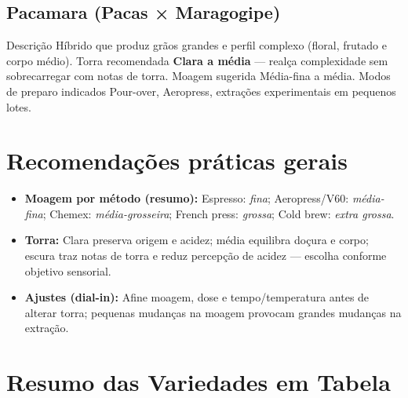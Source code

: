 \documentclass[a4paper,12pt]{article}
\begin{document}
\subsection{Pacamara (Pacas × Maragogipe)}
{Descrição} Híbrido que produz grãos grandes e perfil complexo (floral, frutado e corpo médio).  
{Torra recomendada} \textbf{Clara a média} — realça complexidade sem sobrecarregar com notas de torra.  
{Moagem sugerida} Média-fina a média.  
{Modos de preparo indicados} Pour-over, Aeropress, extrações experimentais em pequenos lotes.

\section{Recomendações práticas gerais}
\begin{itemize}
  \item \textbf{Moagem por método (resumo):} Espresso: \emph{fina}; Aeropress/V60: \emph{média-fina}; Chemex: \emph{média-grosseira}; French press: \emph{grossa}; Cold brew: \emph{extra grossa}.
  \item \textbf{Torra:} Clara preserva origem e acidez; média equilibra doçura e corpo; escura traz notas de torra e reduz percepção de acidez — escolha conforme objetivo sensorial.
  \item \textbf{Ajustes (dial-in):} Afine moagem, dose e tempo/temperatura antes de alterar torra; pequenas mudanças na moagem provocam grandes mudanças na extração.
\end{itemize}

\section{Resumo das Variedades em Tabela}
\end{document}
